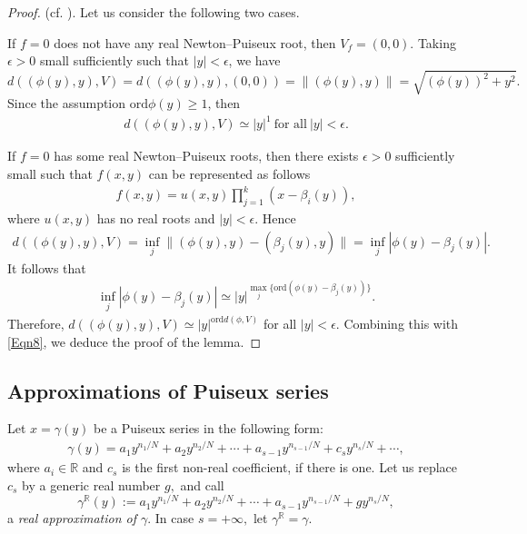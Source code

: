 \documentclass[reqno, 12pt ,a4letter]{amsart}
\theoremstyle{definition}
\begin{document}
\begin{proof}(cf. \cite[Lemma 2.16]{Kuo1974}). Let us consider the following two cases.
	
	If $f=0$ does not have any real Newton--Puiseux root, then $V_f= (0,0)$. Taking $\epsilon > 0$ small sufficiently such that $|y| < \epsilon$, we have $$d((\phi(y),y),V) = d((\phi(y),y), (0,0)) = \|(\phi(y),y)\| = \sqrt{(\phi(y))^2 + y^2}.$$ Since the assumption $\mathrm{ord}\phi(y) \ge 1$, then 
	\begin{align}\label{Eqn8}
	d((\phi(y),y),V) \simeq |y|^1\ \text{for all}\ |y| < \epsilon.	
	\end{align}
	
	If $f=0$ has some real Newton--Puiseux roots, then there exists $\epsilon > 0$ sufficiently small such that $f(x,y)$ can be represented as follows
	\begin{align*}
		f(x,y) = u(x,y)\prod_{j=1}^{k}(x - \beta_i(y)), 
	\end{align*}
	where $u(x,y)$ has no real roots and $|y| < \epsilon$. Hence
	\begin{align*}
		d( (\phi(y),y), V ) = \inf_j\|(\phi(y),y) - (\beta_j(y), y)\| = \inf_j|\phi(y) - \beta_j(y)|.
	\end{align*}
	It follows that 
	\begin{align*}
		\inf_j|\phi(y) - \beta_j(y)| \simeq |y|^{\max_j\{\mathrm{ord}(\phi(y)-\beta_j(y))\}}.
	\end{align*}
	Therefore, $d((\phi(y),y),V) \simeq |y|^{\mathrm{ord}d(\phi, V)}$  for all $|y| < \epsilon$. Combining this with \eqref{Eqn8}, we deduce the proof of the lemma.
\end{proof}

\subsection{Approximations of Puiseux series}\label{real-approx}
Let $x = \gamma(y)$ be a Puiseux series in the following form:
\begin{eqnarray*}
	\gamma(y) = a_1 y^{n_1/N} + a_2y^{n_2/N}+ \cdots + a_{s - 1} y^{n_{s - 1}/N} + c_s y^{n_s/N} +  \cdots,
\end{eqnarray*}
where $a_i \in \mathbb{R}$ and $c_s$ is the first non-real coefficient, if there is one. Let us replace $c_s$ by a generic real number $g,$ and call
\begin{equation}\label{real-approximation}
	\gamma^{\mathbb{R}}(y) := a_1 y^{n_1/N} + a_2y^{n_2/N}+ \cdots + a_{s - 1} y^{n_{s - 1}/N} + g y^{n_s/N},
\end{equation}
a {\em real approximation of $\gamma$}. In case $s = +\infty,$ let $\gamma^{\mathbb{R}} = \gamma.$
\end{document}
